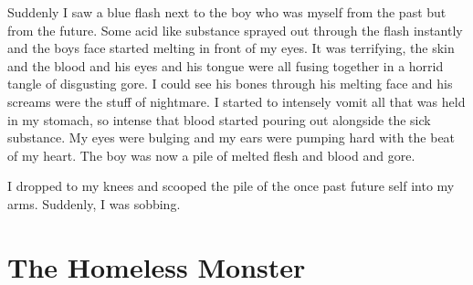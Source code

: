 Suddenly I saw a blue flash next to the boy who was myself from the
past but from the future. Some acid like substance sprayed out
through the flash instantly and the boys face started melting in
front of my eyes. It was terrifying, the skin and the blood and his
eyes and his tongue were all fusing together in a horrid tangle of
disgusting gore. I could see his bones through his melting face and
his screams were the stuff of nightmare. I started to intensely
vomit all that was held in my stomach, so intense that blood
started pouring out alongside the sick substance. My eyes were
bulging and my ears were pumping hard with the beat of my heart.
The boy was now a pile of melted flesh and blood and gore.

I dropped to my knees and scooped the pile of the once past future
self into my arms. Suddenly, I was sobbing. 

 



\chapter{The Homeless Monster}





